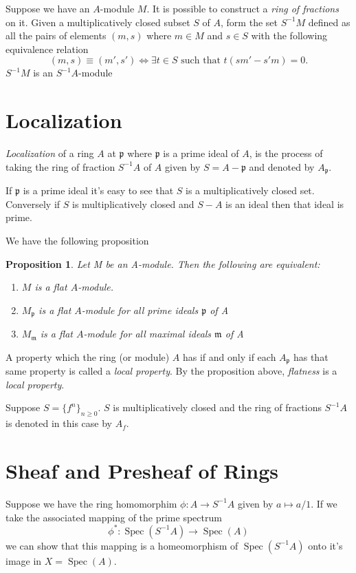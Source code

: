 \documentclass[]{report}
\newtheorem{prop}[theorem]{Proposition}
\DeclareMathOperator\Spec{Spec}
\newcommand\byS{S^{-1}}
\newcommand\mfk[1]{\mathfrak{#1}}
\begin{document}
    Suppose we have an $A$-module $M$. It is possible to construct a \textit{ring of fractions} on it. Given a multiplicatively closed subset $S$ of $A$, form the set $\byS M$ defined as all the pairs of elements $(m,s)$ where $m \in M$ and $s \in S$ with the following equivalence relation 
    $$(m,s) \equiv (m', s') \Leftrightarrow \exists t \in S \text{ such that } t(sm' - s'm) = 0.$$
$\byS M$ is an $\byS A$-module

\section{Localization}

\textit{Localization} of a ring $A$ at $\mfk{p}$ where $\mfk{p}$ is a prime ideal of $A$, is the process of taking the ring of fraction $\byS A$ of $A$ given by $S = A - \mfk{p}$ and denoted by $A_\mfk{p}$.

If $\mfk{p}$ is a prime ideal it's easy to see that $S$ is a multiplicatively closed set. Conversely if $S$ is multiplicatively closed and $S - A$ is an ideal then that ideal is prime.

We have the following proposition
\begin{prop}
    Let M be an A-module. Then the following are equivalent:
    \begin{enumerate}
        \item $M$ is a flat $A$-module.
        \item $M_\mathfrak{p}$ is a flat $A$-module for all prime ideals $\mathfrak{p}$ of A
        \item $M_\mathfrak{m}$ is a flat $A$-module for all maximal ideals $\mathfrak{m}$ of A
    \end{enumerate}
\end{prop}

    A property which the ring (or module) $A$ has if and only if each $A_\mfk{p}$ has that same property is called a \textit{local property}. By the proposition above, \textit{flatness} is a \textit{local property}.

Suppose $S = \{f^n\}_{n\geq 0}$. $S$ is multiplicatively closed and the ring of fractions $\byS A$ is denoted in this case by $A_f$.

\section{Sheaf and Presheaf of Rings}

Suppose we have the ring homomorphim $\phi: A \rightarrow \byS A$ given by $a \mapsto a/1$. If we take the associated mapping of the prime spectrum
    $$\phi^* : \Spec(\byS A) \rightarrow \Spec(A)$$
    we can show that this mapping is a homeomorphism of $\Spec(\byS A)$ onto it's image in $X = \Spec(A)$. 
\end{document}
